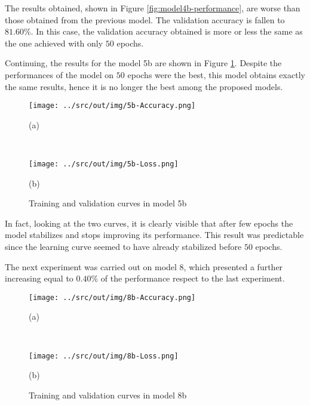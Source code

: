 \documentclass[a4paper,12pt]{article} %
\begin{document}
	The results obtained, shown in Figure \ref{fig:model4b-performance}, are 
	worse than those obtained from the previous model. The validation accuracy 
	is fallen to $81.60\%$. In this case, the validation accuracy obtained 
	is more or less the same as the one achieved with only $50$ epochs.
	\newline
	
	Continuing, the results for the model 5b are shown in Figure 
	\ref{fig:model5b-performance}. Despite the performances of the model on 
	$50$ epochs were the best, this model obtains exactly the same results, 
	hence it is no longer the best among the proposed models. 
	
	\begin{figure}[htb]
		\begin{minipage}[c]{.49\textwidth}
			\centering
			\texttt{[image: ../src/out/img/5b-Accuracy.png]}
			\caption*{(a)}
		\end{minipage}
		~
		\begin{minipage}[c]{.49\textwidth}
			\centering
			\texttt{[image: ../src/out/img/5b-Loss.png]}
			\caption*{(b)}
		\end{minipage}
		\caption{Training and validation curves in model 5b}
		\label{fig:model5b-performance}
	\end{figure}

	In fact, looking at the two curves, it is clearly visible that after few 
	epochs the model stabilizes and stops improving its performance.
	This result was predictable since the learning curve seemed to have already 
	stabilized before $50$ epochs.
	\newline

	The next experiment was carried out on model 8, which presented a further 
	increasing equal to $0.40\%$ of the performance respect to the last 
	experiment.
	
	\begin{figure}[htb]
		\begin{minipage}[c]{.49\textwidth}
			\centering
			\texttt{[image: ../src/out/img/8b-Accuracy.png]}
			\caption*{(a)}
		\end{minipage}
		~
		\begin{minipage}[c]{.49\textwidth}
			\centering
			\texttt{[image: ../src/out/img/8b-Loss.png]}
			\caption*{(b)}
		\end{minipage}
		\caption{Training and validation curves in model 8b}
		\label{fig:model8b-performance}
	\end{figure}
\end{document}
